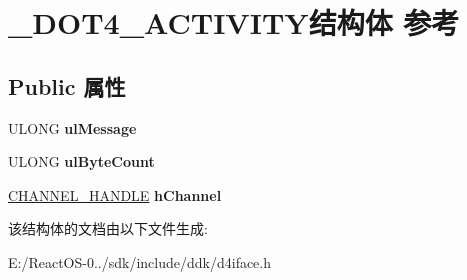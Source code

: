 \hypertarget{struct___d_o_t4___a_c_t_i_v_i_t_y}{}\section{\+\_\+\+D\+O\+T4\+\_\+\+A\+C\+T\+I\+V\+I\+T\+Y结构体 参考}
\label{struct___d_o_t4___a_c_t_i_v_i_t_y}
\subsection*{Public 属性}
\begin{DoxyCompactItemize}
\item 
\mbox{\label{struct___d_o_t4___a_c_t_i_v_i_t_y_a944e24b0ee50d116596d15c87f3f1e88}} 
U\+L\+O\+NG {\bfseries ul\+Message}
\item 
\mbox{\label{struct___d_o_t4___a_c_t_i_v_i_t_y_a240996f632d9ed0749d5b8d81013b9b2}} 
U\+L\+O\+NG {\bfseries ul\+Byte\+Count}
\item 
\mbox{\label{struct___d_o_t4___a_c_t_i_v_i_t_y_abadde311550ada123687980cf3630267}} 
\hyperlink{struct_c_h_a_n_n_e_l___h_a_n_d_l_e__}{C\+H\+A\+N\+N\+E\+L\+\_\+\+H\+A\+N\+D\+LE} {\bfseries h\+Channel}
\end{DoxyCompactItemize}


该结构体的文档由以下文件生成\+:\begin{DoxyCompactItemize}
\item 
E\+:/\+React\+O\+S-\/0../sdk/include/ddk/d4iface.\+h\end{DoxyCompactItemize}
